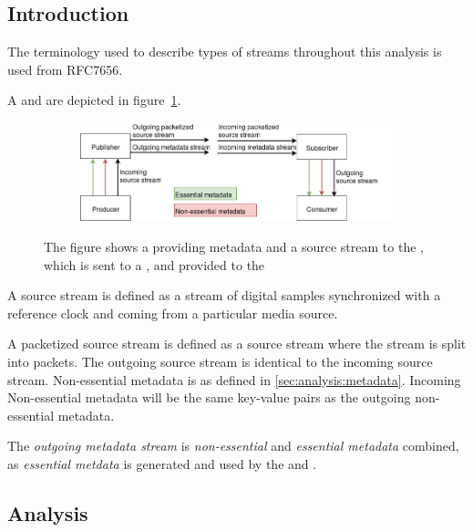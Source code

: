 \subsection{Introduction}
The terminology used to describe types of streams throughout this analysis is used from RFC7656\citep{RFC7656}.

A  and  are depicted in figure~\ref{fig:analysis:pubsub}.

\begin{figure}[h!]
    \centering
    \begin{subfigure}[b]{1\textwidth}
        \includegraphics[width=\textwidth]{figures/publisher-subscriber}
    \end{subfigure}
     \caption{The  figure shows a  providing metadata and a source stream to the \pub, which is sent to a \sub, and provided to the }\label{fig:analysis:pubsub}
\end{figure}


A source stream is defined as a stream of digital samples synchronized with a reference clock and coming from a particular media source.

A packetized source stream is defined as a source stream where the stream is split into packets.
The outgoing source stream is identical to the incoming source stream.
Non-essential metadata is as defined in \ref{sec:analysis:metadata}. Incoming Non-essential metadata will be the same key-value pairs as the outgoing non-essential metadata.

The \textit{outgoing metadata stream} is \textit{non-essential} and \textit{essential metadata} combined, as \textit{essential metdata} is generated and used by the  and . 

\subsection{Analysis} \label{sec:analysis:pubsup:introduction}

